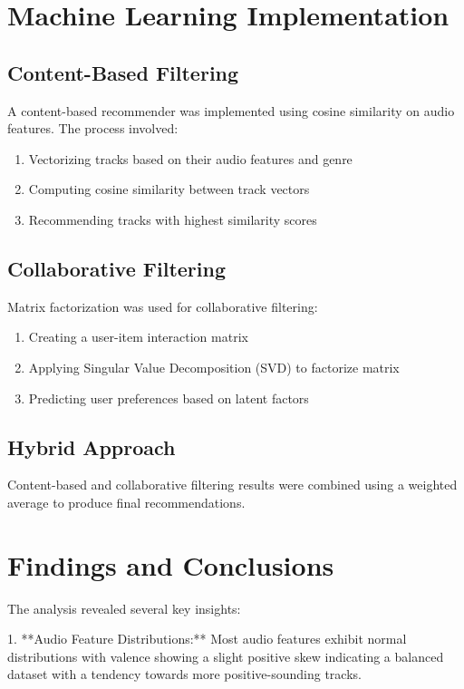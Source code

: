 \documentclass[runningheads]{llncs}
\begin{document}
\section{Machine Learning Implementation}

\subsection{Content-Based Filtering}
A content-based recommender was implemented using cosine similarity on audio features. The process involved:
\begin{enumerate}
    \item Vectorizing tracks based on their audio features and genre
    \item Computing cosine similarity between track vectors
    \item Recommending tracks with highest similarity scores
\end{enumerate}

\subsection{Collaborative Filtering}
Matrix factorization was used for collaborative filtering:
\begin{enumerate}
    \item Creating a user-item interaction matrix
    \item Applying Singular Value Decomposition (SVD) to factorize matrix
    \item Predicting user preferences based on latent factors
\end{enumerate}

\subsection{Hybrid Approach}
Content-based and collaborative filtering results were combined using a weighted average to produce final recommendations.

\section{Findings and Conclusions}

The analysis revealed several key insights:

1. **Audio Feature Distributions:** Most audio features exhibit normal distributions with valence showing a slight positive skew indicating a balanced dataset with a tendency towards more positive-sounding tracks.
  
\end{document}

